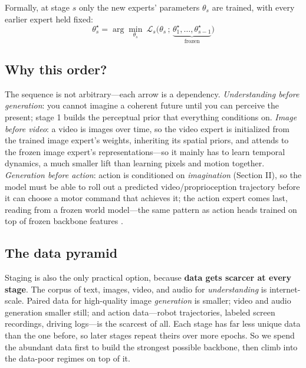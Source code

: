 \documentclass[10pt,conference]{IEEEtran}
\begin{document}
Formally, at stage $s$ only the new experts' parameters $\theta_s$ are trained,
with every earlier expert held fixed:
\begin{equation}
\theta_s^{\star} = \arg\min_{\theta_s}\ \mathcal{L}_s\big(\theta_s \,;\, \underbrace{\theta_1^{\star},\dots,\theta_{s-1}^{\star}}_{\text{frozen}}\big)
\end{equation}

\subsection{Why this order?}
The sequence is not arbitrary---each arrow is a dependency. \emph{Understanding
before generation}: you cannot imagine a coherent future until you can perceive
the present; stage 1 builds the perceptual prior that everything conditions on.
\emph{Image before video}: a video is images over time, so the video expert
is initialized from the trained image expert's weights, inheriting its spatial
priors, and attends to the frozen image expert's representations---so it mainly
has to learn temporal dynamics, a much smaller lift than learning pixels and
motion together.
\emph{Generation before action}: action is conditioned on \emph{imagination}
(Section II), so the model must be able to roll out a predicted
video/proprioception trajectory before it can choose a motor command that
achieves it; the action expert comes last, reading from a frozen world
model---the same pattern as action heads trained on top of frozen backbone
features \cite{ref23,ref27}.

\subsection{The data pyramid}
Staging is also the only practical option, because \textbf{data gets scarcer at
every stage}. The corpus of text, images, video, and audio for
\emph{understanding} is internet-scale. Paired data for high-quality image
\emph{generation} is smaller; video and audio generation smaller still; and
action data---robot trajectories, labeled screen recordings, driving logs---is
the scarcest of all. Each stage has far less unique data than the one before, so
later stages repeat theirs over more epochs. So we spend the abundant data first to build the strongest
possible backbone, then climb into the data-poor regimes on top of it.
\end{document}
